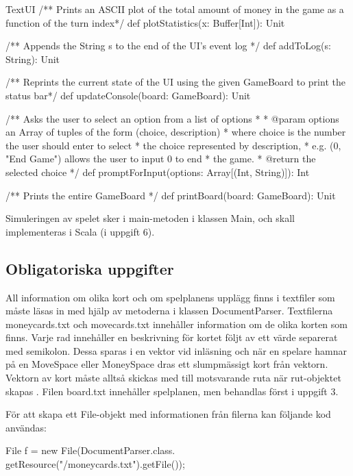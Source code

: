 \begin{ScalaSpec}{TextUI}
   /** Prints an ASCII plot of the total amount 
	of money in the game as a function of the turn index*/
  def plotStatistics(x: Buffer[Int]): Unit

  /** Appends the String s to the end of the UI's event log */
  def addToLog(s: String): Unit 

  /** Reprints the current state of the UI using the given
	GameBoard to print the status bar*/
  def updateConsole(board: GameBoard): Unit 

 
  /** Asks the user to select an option from a list of options
    *
    * @param options an Array of tuples of the form (choice, description)
    *                where choice is the number the user should enter to select 
    *                the choice represented by description,
    *                e.g. (0,  "End Game") allows the user to input 0 to end 
    *                the game.
    * @return        the selected choice
    */
  def promptForInput(options: Array[(Int, String)]): Int 

  /** Prints the entire GameBoard */
  def printBoard(board: GameBoard): Unit 

 
\end{ScalaSpec}

Simuleringen av spelet sker i main-metoden i klassen Main, och skall implementeras i Scala (i uppgift 6).


\subsection{Obligatoriska uppgifter}

\Task All information om olika kort och om spelplanens upplägg finns i textfiler som måste läsas in med hjälp av metoderna i klassen DocumentParser. 
Textfilerna moneycards.txt och movecards.txt innehåller information om de olika korten som finns.
Varje rad innehåller en beskrivning för kortet följt av ett värde separerat med semikolon. Dessa sparas i en vektor vid inläsning och när en spelare hamnar på en MoveSpace eller MoneySpace dras ett slumpmässigt kort från vektorn. Vektorn av kort måste alltså skickas med till motsvarande ruta när rut-objektet skapas .
Filen board.txt innehåller spelplanen, men behandlas först i uppgift 3.

För att skapa ett File-objekt med informationen från filerna kan följande kod användas:
\newline
\newline
\begin{Code}
File f = new File(DocumentParser.class.
        getResource("/moneycards.txt").getFile());
\end{Code}

